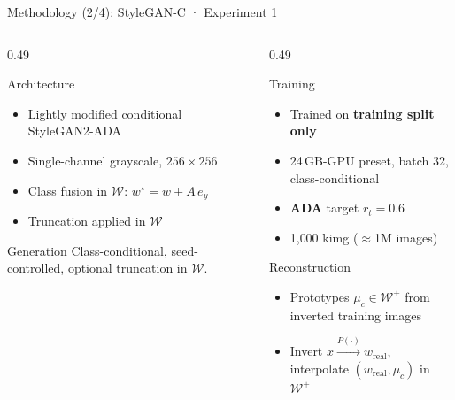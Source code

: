 \documentclass[aspectratio=169]{beamer}
\begin{document}
\begin{frame}{Methodology (2/4): StyleGAN-C · Experiment 1}
  \footnotesize
  \begin{columns}[T]
    \begin{column}{0.49\textwidth}
      {%
      \begin{block}{Architecture}
        \begin{itemize}\itemsep1pt
          \item Lightly modified conditional StyleGAN2-ADA
          \item Single-channel grayscale, $256\times256$
          \item Class fusion in $\mathcal{W}$: $w^\star = w + A\,e_y$
          \item Truncation applied in $\mathcal{W}$
        \end{itemize}
      \end{block}}

      \vspace{0.2em}
      {%
      \begin{block}{Generation}
        Class-conditional, seed-controlled,
        optional truncation in $\mathcal{W}$.
      \end{block}}
    \end{column}
    \begin{column}{0.49\textwidth}
      {%
      \begin{block}{Training}
        \begin{itemize}\itemsep1pt
          \item Trained on \textbf{training split only}
          \item 24\,GB-GPU preset, batch 32, class-conditional
          \item \textbf{ADA} target $r_t = 0.6$
          \item 1{,}000 kimg ($\approx$1M images)
        \end{itemize}
      \end{block}}

      \vspace{0.2em}
      {%
      \begin{block}{Reconstruction}
        \begin{itemize}\itemsep1pt
          \item Prototypes $\mu_c \in \mathcal{W}^+$ from inverted training images
          \item Invert $x \xrightarrow{P(\cdot)} w_{\text{real}}$,
                interpolate $(w_{\text{real}}, \mu_c)$ in $\mathcal{W}^+$
        \end{itemize}
      \end{block}}
    \end{column}
  \end{columns}
\end{frame}
\end{document}
